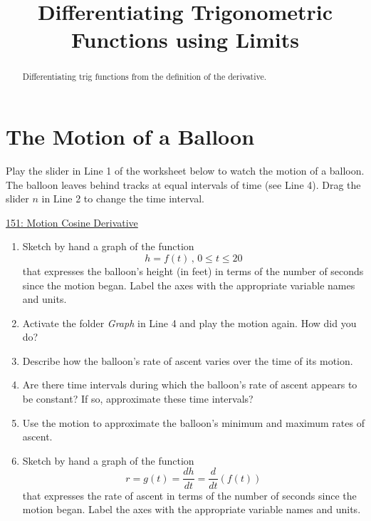 \documentclass{ximera}
\title{Differentiating Trigonometric Functions using Limits}
\begin{document}
\begin{abstract}
Differentiating trig functions from the definition of the derivative.
\end{abstract}
\maketitle



\section{The Motion of a Balloon}

\begin{example} \label{ELdebar3}

Play the slider in Line 1 of the worksheet below to watch the motion of a balloon. The balloon leaves behind tracks at equal intervals of time (see Line 4). Drag the slider $n$ in Line 2 to change the time interval.

\begin{onlineOnly}
    \begin{center}
\end{center}
\end{onlineOnly}

\href{https://www.desmos.com/calculator/xsk95weesg}{151: Motion Cosine Derivative}

\begin{enumerate}
\item Sketch by hand a graph of the function
\[
    h  = f(t) \, , \, 0\leq t \leq 20
\]
that expresses the balloon's height (in feet) in terms of the number of seconds since the motion began. Label the axes with the appropriate variable names and units.

\item Activate the folder \emph{Graph} in Line 4 and play the motion again. How did you do?

\item Describe how the balloon's rate of ascent varies over the time of its motion. 

\item Are there time intervals during which the balloon's rate of ascent appears to be constant? If so, approximate these time intervals?

\item Use the motion to approximate the balloon's minimum and maximum rates of ascent. 

\item Sketch by hand a graph of the function
\[
     r = g(t) = \frac{dh}{dt} = \frac{d}{dt}\left( f(t) \right)
\]
that expresses the rate of ascent in terms of the number of seconds since the motion began. Label the axes with the appropriate variable names and units.
\end{enumerate}
\end{example}
\end{document}
